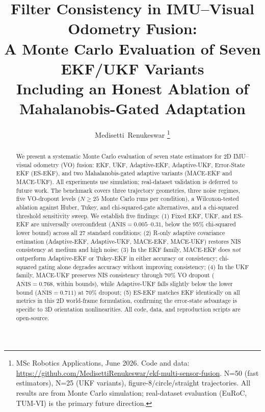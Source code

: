 \documentclass[letterpaper, 10pt, journal]{IEEEtran}
\begin{document}
\title{Filter Consistency in IMU--Visual Odometry Fusion:\\
A Monte Carlo Evaluation of Seven EKF/UKF Variants\\
Including an Honest Ablation of Mahalanobis-Gated Adaptation}

\author{Medisetti~Renukeswar%
  \thanks{MSc Robotics Applications, June 2026.
    Code and data: \url{https://github.com/MedisettiRenukeswar/ekf-multi-sensor-fusion}.
    N=50 (fast estimators), N=25 (UKF variants), figure-8/circle/straight trajectories.
    All results are from Monte Carlo simulation; real-dataset evaluation
    (EuRoC, TUM-VI) is the primary future direction.}}
\maketitle

\begin{abstract}
We present a systematic Monte Carlo evaluation of seven state estimators for
2D IMU--visual odometry (VO) fusion: EKF, UKF, Adaptive-EKF, Adaptive-UKF,
Error-State EKF (ES-EKF), and two Mahalanobis-gated adaptive variants
(MACE-EKF and MACE-UKF). All experiments use simulation; real-dataset
validation is deferred to future work.
The benchmark covers three trajectory geometries, three noise regimes,
five VO-dropout levels ($N\!\geq\!25$ Monte Carlo runs per condition),
a Wilcoxon-tested ablation against Huber, Tukey, and chi-squared-gate
alternatives, and a chi-squared threshold sensitivity sweep.
We establish five findings:
(1) Fixed EKF, UKF, and ES-EKF are universally overconfident
    ($\overline{\text{ANIS}} = 0.005$--$0.31$, below the 95\% chi-squared
    lower bound) across all 27 standard conditions;
(2) R-only adaptive covariance estimation (Adaptive-EKF, Adaptive-UKF,
    MACE-EKF, MACE-UKF) restores NIS consistency at medium and high noise;
(3) In the EKF family, MACE-EKF does \emph{not} outperform Adaptive-EKF
    or Tukey-EKF in either accuracy or consistency; chi-squared gating
    alone degrades accuracy without improving consistency;
(4) In the UKF family, MACE-UKF preserves NIS consistency through $70\%$
    VO dropout ($\overline{\text{ANIS}} = 0.768$, within bounds), while
    Adaptive-UKF falls slightly below the lower bound
    ($\overline{\text{ANIS}} = 0.711$) at $70\%$ dropout;
(5) ES-EKF matches EKF identically on all metrics in this 2D world-frame
    formulation, confirming the error-state advantage is specific to 3D
    orientation nonlinearities.
All code, data, and reproduction scripts are open-source.
\end{abstract}
\end{document}
